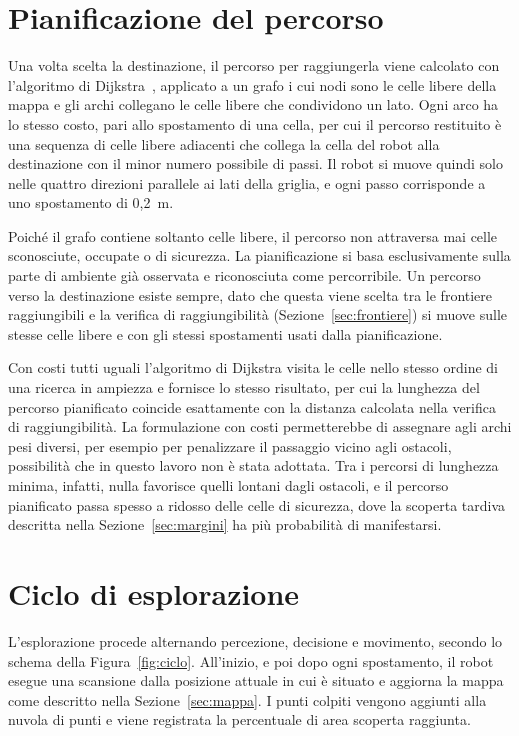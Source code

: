 \section{Pianificazione del percorso}
\label{sec:pianificazione}

Una volta scelta la destinazione, il percorso per raggiungerla viene calcolato con l'algoritmo di Dijkstra~\cite{dijkstra1959}, applicato a un grafo i cui nodi sono le celle libere della mappa e gli archi collegano le celle libere che condividono un lato. Ogni arco ha lo stesso costo, pari allo spostamento di una cella, per cui il percorso restituito è una sequenza di celle libere adiacenti che collega la cella del robot alla destinazione con il minor numero possibile di passi. Il robot si muove quindi solo nelle quattro direzioni parallele ai lati della griglia, e ogni passo corrisponde a uno spostamento di 0,2~m.

Poiché il grafo contiene soltanto celle libere, il percorso non attraversa mai celle sconosciute, occupate o di sicurezza. La pianificazione si basa esclusivamente sulla parte di ambiente già osservata e riconosciuta come percorribile. Un percorso verso la destinazione esiste sempre, dato che questa viene scelta tra le frontiere raggiungibili e la verifica di raggiungibilità (Sezione~\ref{sec:frontiere}) si muove sulle stesse celle libere e con gli stessi spostamenti usati dalla pianificazione.

Con costi tutti uguali l'algoritmo di Dijkstra visita le celle nello stesso ordine di una ricerca in ampiezza e fornisce lo stesso risultato, per cui la lunghezza del percorso pianificato coincide esattamente con la distanza calcolata nella verifica di raggiungibilità. La formulazione con costi permetterebbe di assegnare agli archi pesi diversi, per esempio per penalizzare il passaggio vicino agli ostacoli, possibilità che in questo lavoro non è stata adottata. Tra i percorsi di lunghezza minima, infatti, nulla favorisce quelli lontani dagli ostacoli, e il percorso pianificato passa spesso a ridosso delle celle di sicurezza, dove la scoperta tardiva descritta nella Sezione~\ref{sec:margini} ha più probabilità di manifestarsi.

\section{Ciclo di esplorazione}
\label{sec:ciclo}

L'esplorazione procede alternando percezione, decisione e movimento, secondo lo schema della Figura~\ref{fig:ciclo}. All'inizio, e poi dopo ogni spostamento, il robot esegue una scansione dalla posizione attuale in cui è situato e aggiorna la mappa come descritto nella Sezione~\ref{sec:mappa}. I punti colpiti vengono aggiunti alla nuvola di punti e viene registrata la percentuale di area scoperta raggiunta.

